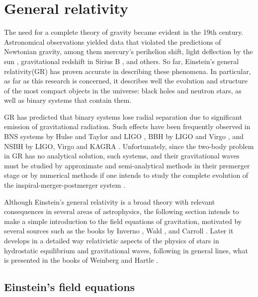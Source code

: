 \section{General relativity}

The need for a complete theory of gravity became evident in the 19th century. Astronomical observations yielded data that violated the predictions of Newtonian gravity, among them mercury's perihelion shift\cite{1859AnPar...5....1L}, light deflection by the sun \cite{1920RSPTA.220..291D}, gravitational redshift in Sirius B \cite{2010JHA....41...41H}, and others. So far, Einstein's general relativity(GR) has proven accurate in describing these phenomena. In particular, as far as this research is concerned, it describes well the evolution and structure of the most compact objects in the universe: black holes and neutron stars, as well as binary systems that contain them.

GR has predicted that binary systems lose radial separation due to significant emission of gravitational radiation. Such effects have been frequently observed in BNS systems by Hulse and Taylor \cite{Weisberg:1981mt} and LIGO \cite{LIGOScientific:2017vwq}, BBH by LIGO and Virgo \cite{LIGOScientific:2016aoc}, and NSBH by LIGO, Virgo and KAGRA \cite{LIGOScientific:2021qlt}. Unfortunately, since the two-body problem in GR has no analytical solution, such systems, and their gravitational waves must be studied by approximate and semi-analytical methods in their premerger stage or by numerical methods if one intends to study the complete evolution of the inspiral-merger-postmerger system \cite{Dietrich:2018phi}.

Although Einstein's general relativity is a broad theory with relevant consequences in several areas of astrophysics, the following section intends to make a simple introduction to the field equations of gravitation, motivated by several sources such as the books by Inverno \cite{inverno}, Wald \cite{Wald:1984rg}, and Carroll \cite{carroll-notes}. Later it develops in a detailed way relativistic aspects of the physics of stars in hydrostatic equilibrium and gravitational waves, following in general lines, what is presented in the books of Weinberg \cite{Weinberg:1972kfs} and Hartle \cite{Hartle:2021pel}.




\subsection{Einstein's field equations}

